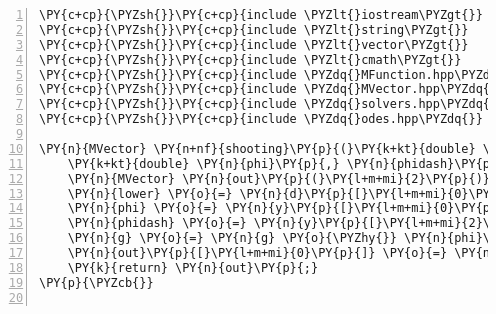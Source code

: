 \begin{Verbatim}[tabsize=2,commandchars=\\\{\},numbers=left,firstnumber=1,stepnumber=1]
\PY{c+cp}{\PYZsh{}}\PY{c+cp}{include \PYZlt{}iostream\PYZgt{}}
\PY{c+cp}{\PYZsh{}}\PY{c+cp}{include \PYZlt{}string\PYZgt{}}
\PY{c+cp}{\PYZsh{}}\PY{c+cp}{include \PYZlt{}vector\PYZgt{}}
\PY{c+cp}{\PYZsh{}}\PY{c+cp}{include \PYZlt{}cmath\PYZgt{}}
\PY{c+cp}{\PYZsh{}}\PY{c+cp}{include \PYZdq{}MFunction.hpp\PYZdq{}}
\PY{c+cp}{\PYZsh{}}\PY{c+cp}{include \PYZdq{}MVector.hpp\PYZdq{}}
\PY{c+cp}{\PYZsh{}}\PY{c+cp}{include \PYZdq{}solvers.hpp\PYZdq{}}
\PY{c+cp}{\PYZsh{}}\PY{c+cp}{include \PYZdq{}odes.hpp\PYZdq{}}

\PY{n}{MVector} \PY{n+nf}{shooting}\PY{p}{(}\PY{k+kt}{double} \PY{n}{g}\PY{p}{,} \PY{n}{MVector} \PY{o}{\PYZam{}}\PY{n}{y}\PY{p}{,} \PY{n}{MVector} \PY{n}{d}\PY{p}{)}\PY{p}{\PYZob{}}
	\PY{k+kt}{double} \PY{n}{phi}\PY{p}{,} \PY{n}{phidash}\PY{p}{,} \PY{n}{lower}\PY{p}{,} \PY{n}{upper}\PY{p}{;}
	\PY{n}{MVector} \PY{n}{out}\PY{p}{(}\PY{l+m+mi}{2}\PY{p}{)}\PY{p}{;}
	\PY{n}{lower} \PY{o}{=} \PY{n}{d}\PY{p}{[}\PY{l+m+mi}{0}\PY{p}{]}\PY{p}{;} \PY{n}{upper} \PY{o}{=} \PY{n}{d}\PY{p}{[}\PY{l+m+mi}{1}\PY{p}{]}\PY{p}{;}
	\PY{n}{phi} \PY{o}{=} \PY{n}{y}\PY{p}{[}\PY{l+m+mi}{0}\PY{p}{]} \PY{o}{\PYZhy{}} \PY{n}{upper}\PY{p}{;} \PY{c+c1}{// check the boundary conditions}
	\PY{n}{phidash} \PY{o}{=} \PY{n}{y}\PY{p}{[}\PY{l+m+mi}{2}\PY{p}{]}\PY{p}{;}
	\PY{n}{g} \PY{o}{=} \PY{n}{g} \PY{o}{\PYZhy{}} \PY{n}{phi}\PY{o}{/}\PY{n}{phidash}\PY{p}{;}
	\PY{n}{out}\PY{p}{[}\PY{l+m+mi}{0}\PY{p}{]} \PY{o}{=} \PY{n}{g}\PY{p}{;} \PY{n}{out}\PY{p}{[}\PY{l+m+mi}{1}\PY{p}{]} \PY{o}{=} \PY{n}{phi}\PY{p}{;}
	\PY{k}{return} \PY{n}{out}\PY{p}{;}
\PY{p}{\PYZcb{}}


\end{Verbatim}
